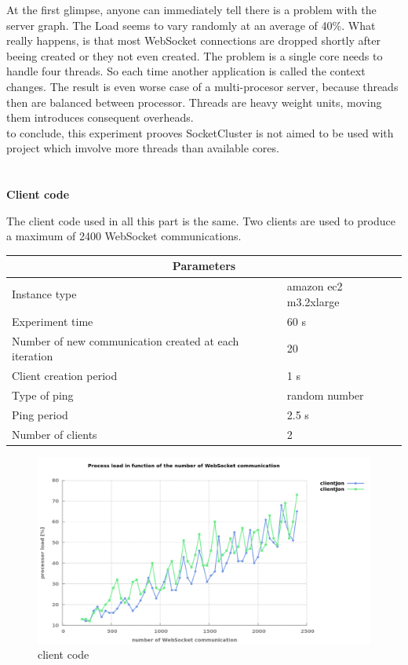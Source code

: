 At the first glimpse, anyone can immediately tell there is a problem with the server
graph. The Load seems to vary randomly at an average of 40\%. What really happens, is
that most WebSocket connections are dropped shortly after beeing created or they 
not even created. The problem is a single core needs to handle four threads. So each
time another application is called the context changes. The result is even worse case of 
a multi-procesor server, because threads then are balanced between processor. Threads 
are heavy weight units, moving them introduces consequent overheads.\\

to conclude, this experiment prooves SocketCluster is not aimed to be used with
project which imvolve more threads than available cores.\\


\section{}


\textbf{Client code}

The client code used in all this part is the same. Two clients are used to
produce a maximum of 2400 WebSocket communications.


\begin{center}
  \begin{tabular}{ | l | l |}
  \hline
  \multicolumn{2}{|c|}{Parameters} \\
  \hline
    Instance type &  amazon ec2 m3.2xlarge\\ 
    Experiment time & 60 s \\
    Number of new communication created at each iteration & 20 \\
    Client creation period & 1 s \\
    Type of ping & random number \\ 
    Ping period & 2.5 s \\ 
    Number of clients & 2 \\
  \hline
  \end{tabular}
\end{center}


\begin{figure}[H]
	\centering
		\includegraphics[width=\textwidth]{./Figures/WS_client_rising.png}
	\caption[Simple WebSocket client]{client code}
	\label{fig:WS_client_rising}
\end{figure}


